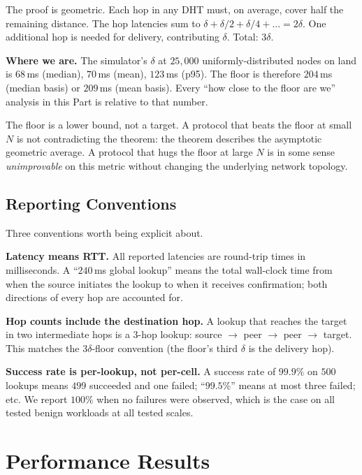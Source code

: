 \documentclass[twoside,nobib]{tufte-book}
\begin{document}
The proof is geometric. Each hop in any DHT must, on average,
cover half the remaining distance. The hop latencies sum to
$\delta + \delta/2 + \delta/4 + \ldots = 2\delta$. One additional
hop is needed for delivery, contributing $\delta$. Total:
$3\delta$.

\textbf{Where we are.} The simulator's $\delta$ at $25{,}000$
uniformly-distributed nodes on land is $68$\,ms (median),
$70$\,ms (mean), $123$\,ms (p95). The floor is therefore
$204$\,ms (median basis) or $209$\,ms (mean basis). Every
``how close to the floor are we'' analysis in this Part is
relative to that number.

The floor is a lower bound, not a target. A protocol that beats
the floor at small $N$ is not contradicting the theorem: the
theorem describes the asymptotic geometric average. A protocol
that hugs the floor at large $N$ is in some sense
\emph{unimprovable} on this metric without changing the underlying
network topology.

\section{Reporting Conventions}

Three conventions worth being explicit about.

\textbf{Latency means RTT.} All reported latencies are round-trip
times in milliseconds. A ``$240$\,ms global lookup'' means the
total wall-clock time from when the source initiates the lookup
to when it receives confirmation; both directions of every hop
are accounted for.

\textbf{Hop counts include the destination hop.} A lookup that
reaches the target in two intermediate hops is a $3$-hop lookup:
source $\to$ peer $\to$ peer $\to$ target. This matches the
$3\delta$-floor convention (the floor's third $\delta$ is the
delivery hop).

\textbf{Success rate is per-lookup, not per-cell.} A success
rate of $99.9\%$ on $500$ lookups means $499$ succeeded and one
failed; ``$99.5\%$'' means at most three failed; etc. We report
$100\%$ when no failures were observed, which is the case on all
tested benign workloads at all tested scales.


\chapter{Performance Results}
\label{ch:eval-perf}
\end{document}

